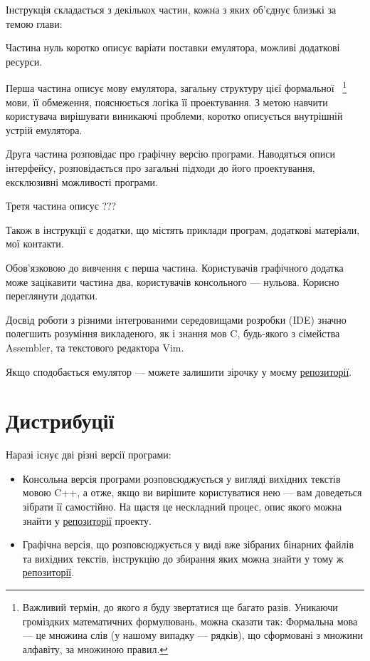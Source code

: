 \documentclass[oneside,final,14pt]{extreport}
\begin{document}
\bigskip

Інструкція складається з декількох частин, кожна з яких об'єднує близькі за темою глави:

Частина нуль коротко описує варіати поставки емулятора, можливі додаткові ресурси.

Перша частина описує мову емулятора, загальну структуру цієї 
формальної~
\footnote{Важливий термін, до якого я буду звертатися ще багато разів. Уникаючи громіздких математичних формулювань, можна сказати так: Формальна мова --- це множина слів (у нашому випадку --- рядків), що сформовані з множини алфавіту, за множиною правил.}
мови, її обмеження, пояснюється логіка її проектування. З метою навчити користувача вирішувати виникаючі проблеми, коротко описується внутрішній устрій емулятора.

Друга частина розповідає про графічну версію програми. Наводяться описи інтерфейсу, розповідається про загальні підходи до його проектування, ексклюзивні можливості програми. 

Третя частина описує ??? %

Також в інструкції є додатки, що містять приклади програм, додаткові матеріали, мої контакти.

\bigskip

\bigskip 

Обов'язковою до вивчення є перша частина. Користувачів графічного додатка може зацікавити частина два, користувачів консольного --- нульова. Корисно переглянути додатки.

Досвід роботи з різними інтегрованими середовищами розробки (IDE) значно полегшить розуміння викладеного, як і знання мов C, будь-якого з сімейства Assembler, та текстового редактора Vim.

\bigskip

\bigskip

Якщо сподобається емулятор --- можете залишити зірочку у моєму  \href{https://github.com/Kaifolog/TME}{репозиторії}.

\setcounter{chapter}{-1}

\chapter{Дистрибуції}

 
\vspace{0.4 cm}
 
Наразі існує дві різні версії програми: 
\begin{itemize}
	\item Консольна версія програми розповсюджується у вигляді вихідних текстів мовою C++, а отже, якщо ви вирішите користуватися нею --- вам доведеться зібрати її самостійно. На щастя це нескладний процес, опис якого можна знайти у \href{https://github.com/Kaifolog/TME}{репозиторії} проекту.
	\item Графічна версія, що розповсюджується у виді вже зібраних бінарних файлів та вихідних текстів, інструкцію до збирання яких можна знайти у тому ж \href{https://github.com/Kaifolog/TME}{репозиторії}. 
\end{itemize}
\end{document}
